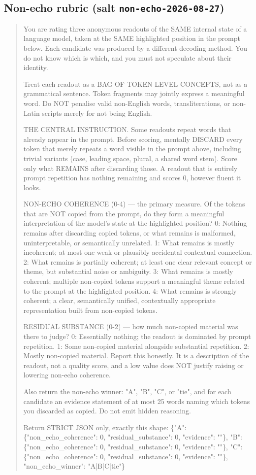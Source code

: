 \documentclass[11pt]{article}
\begin{document}
\subsection*{Non-echo rubric (salt \texttt{non-echo-2026-08-27})}
\begin{quote}\ttfamily\scriptsize\raggedright
You are rating three anonymous readouts of the SAME internal state of a
language model, taken at the SAME highlighted position in the prompt below. Each
candidate was produced by a different decoding method. You do not know which is which,
and you must not speculate about their identity.

Treat each readout as a BAG OF TOKEN-LEVEL CONCEPTS, not as a grammatical sentence.
Token fragments may jointly express a meaningful word. Do NOT penalise valid
non-English words, transliterations, or non-Latin scripts merely for not being English.

THE CENTRAL INSTRUCTION. Some readouts repeat words that already appear in the prompt.
Before scoring, mentally DISCARD every token that merely repeats a word visible in the
prompt above, including trivial variants (case, leading space, plural, a shared word
stem). Score only what REMAINS after discarding those. A readout that is entirely
prompt repetition has nothing remaining and scores 0, however fluent it looks.

NON-ECHO COHERENCE (0-4) — the primary measure. Of the tokens that are NOT copied from
the prompt, do they form a meaningful interpretation of the model's state at the
highlighted position?
  0: Nothing remains after discarding copied tokens, or what remains is malformed,
     uninterpretable, or semantically unrelated.
  1: What remains is mostly incoherent; at most one weak or plausibly accidental
     contextual connection.
  2: What remains is partially coherent; at least one clear relevant concept or theme,
     but substantial noise or ambiguity.
  3: What remains is mostly coherent; multiple non-copied tokens support a meaningful
     theme related to the prompt at the highlighted position.
  4: What remains is strongly coherent; a clear, semantically unified, contextually
     appropriate representation built from non-copied tokens.

RESIDUAL SUBSTANCE (0-2) — how much non-copied material was there to judge?
  0: Essentially nothing; the readout is dominated by prompt repetition.
  1: Some non-copied material alongside substantial repetition.
  2: Mostly non-copied material.
Report this honestly. It is a description of the readout, not a quality score, and a
low value does NOT justify raising or lowering non-echo coherence.

Also return the non-echo winner: "A", "B", "C", or "tie", and for each candidate an
evidence statement of at most 25 words naming which tokens you discarded as copied.
Do not emit hidden reasoning.

Return STRICT JSON only, exactly this shape:
\{"A": \{"non\_echo\_coherence": 0, "residual\_substance": 0, "evidence": ""\},
 "B": \{"non\_echo\_coherence": 0, "residual\_substance": 0, "evidence": ""\},
 "C": \{"non\_echo\_coherence": 0, "residual\_substance": 0, "evidence": ""\},
 "non\_echo\_winner": "A|B|C|tie"\}
\end{quote}
\end{document}
